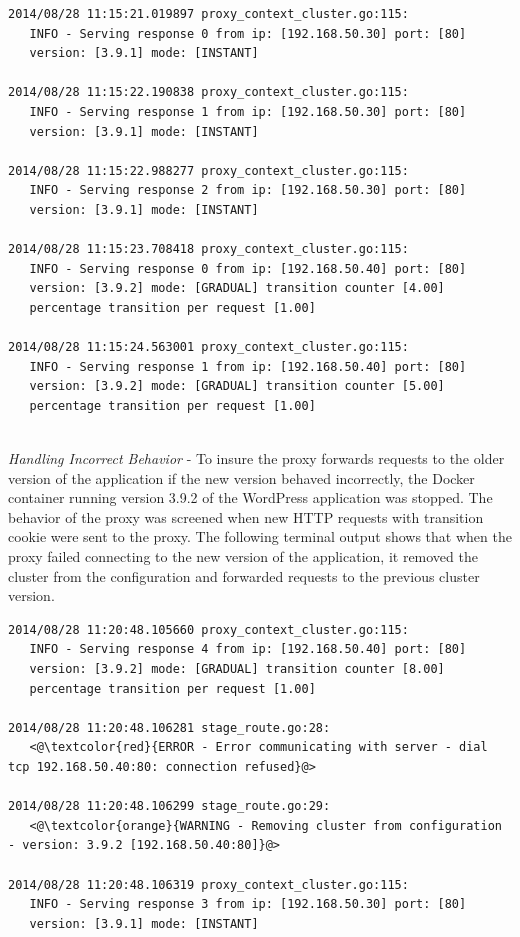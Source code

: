 \documentclass[a4paper,11pt,twoside]{report}
\begin{document}
\begin{lstlisting}[language=terminal]
2014/08/28 11:15:21.019897 proxy_context_cluster.go:115:     
   INFO - Serving response 0 from ip: [192.168.50.30] port: [80] 
   version: [3.9.1] mode: [INSTANT]

2014/08/28 11:15:22.190838 proxy_context_cluster.go:115:     
   INFO - Serving response 1 from ip: [192.168.50.30] port: [80] 
   version: [3.9.1] mode: [INSTANT]

2014/08/28 11:15:22.988277 proxy_context_cluster.go:115:     
   INFO - Serving response 2 from ip: [192.168.50.30] port: [80] 
   version: [3.9.1] mode: [INSTANT]

2014/08/28 11:15:23.708418 proxy_context_cluster.go:115:     
   INFO - Serving response 0 from ip: [192.168.50.40] port: [80] 
   version: [3.9.2] mode: [GRADUAL] transition counter [4.00] 
   percentage transition per request [1.00]
   
2014/08/28 11:15:24.563001 proxy_context_cluster.go:115:     
   INFO - Serving response 1 from ip: [192.168.50.40] port: [80] 
   version: [3.9.2] mode: [GRADUAL] transition counter [5.00] 
   percentage transition per request [1.00]
\end{lstlisting}

\noindent\\
\textit{Handling Incorrect Behavior} - To insure the proxy forwards requests to the older version of the application if the new version behaved incorrectly, the Docker container running version 3.9.2 of the WordPress application was stopped. The behavior of the proxy was screened when new HTTP requests with transition cookie were sent to the proxy. The following terminal output shows that when the proxy failed connecting to the new version of the application, it removed the cluster from the configuration and forwarded requests to the previous cluster version. \smallskip

\begin{lstlisting}[language=terminal]
2014/08/28 11:20:48.105660 proxy_context_cluster.go:115:     
   INFO - Serving response 4 from ip: [192.168.50.40] port: [80] 
   version: [3.9.2] mode: [GRADUAL] transition counter [8.00] 
   percentage transition per request [1.00]
   
2014/08/28 11:20:48.106281 stage_route.go:28:    
   <@\textcolor{red}{ERROR - Error communicating with server - dial tcp 192.168.50.40:80: connection refused}@>

2014/08/28 11:20:48.106299 stage_route.go:29:  
   <@\textcolor{orange}{WARNING - Removing cluster from configuration - version: 3.9.2 [192.168.50.40:80]}@>

2014/08/28 11:20:48.106319 proxy_context_cluster.go:115:     
   INFO - Serving response 3 from ip: [192.168.50.30] port: [80] 
   version: [3.9.1] mode: [INSTANT]
\end{lstlisting}   
\end{document}
